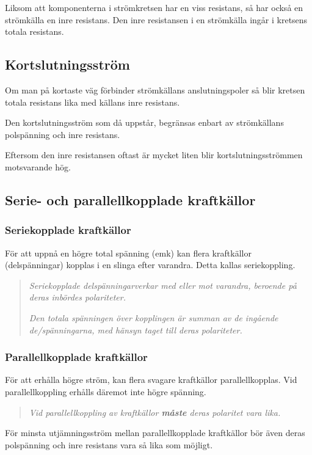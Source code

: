 Liksom att komponenterna i strömkretsen har en viss resistans, så har också en
strömkälla en inre resistans. Den inre resistansen i en strömkälla ingår i
kretsens totala resistans.

\subsection{Kortslutningsström}

Om man på kortaste väg förbinder strömkällans anslutningspoler så blir kretsen
totala resistans lika med källans inre resistans.

Den kortslutningsström som då uppstår, begränsas enbart av strömkällans
polspänning och inre resistans.

Eftersom den inre resistansen oftast är mycket liten blir kortslutningsströmmen
motsvarande hög.

\subsection{Serie- och parallellkopplade kraftkällor}

\subsubsection{Seriekopplade kraftkällor}

För att uppnå en högre total spänning (emk) kan flera kraftkällor
(delspänningar) kopplas i en slinga efter varandra. Detta kallas seriekoppling.

\begin{quote}
\emph{Seriekopplade delspänningarverkar med eller mot varandra, beroende på
deras inbördes polariteter.}

\emph{Den totala spänningen över kopplingen är summan av de ingående
de/spänningarna, med hänsyn taget till deras polariteter.}
\end{quote}

\subsubsection{Parallellkopplade kraftkällor}

För att erhålla högre ström, kan flera svagare kraftkällor parallellkopplas. Vid
parallellkoppling erhålls däremot inte högre spänning.

\begin{quote}
\emph{Vid parallellkoppling av kraftkällor \textbf{måste} deras polaritet vara lika.}
\end{quote}

För minsta utjämningsström mellan parallellkopplade kraftkällor bör även deras
polspänning och inre resistans vara så lika
som möjligt.
